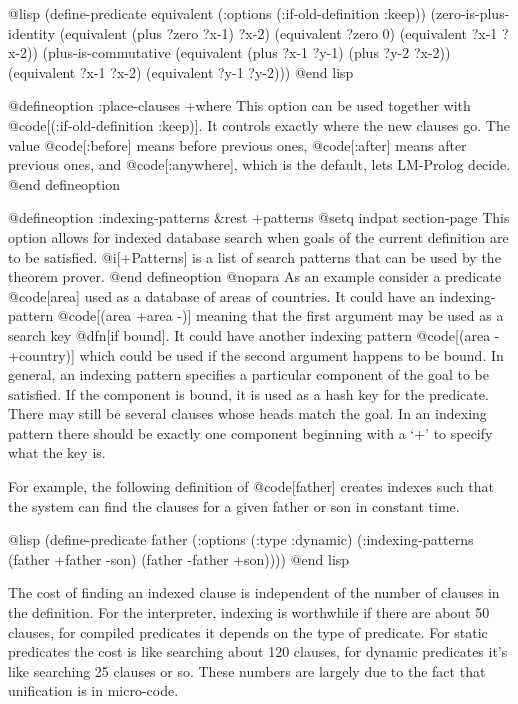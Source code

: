 {@lisp
(define-predicate equivalent
  (:options (:if-old-definition :keep))
  (zero-is-plus-identity
    (equivalent (plus ?zero ?x-1) ?x-2)
    (equivalent ?zero 0)
    (equivalent ?x-1 ?x-2))
  (plus-is-commutative
    (equivalent (plus ?x-1 ?y-1) (plus ?y-2 ?x-2))
    (equivalent ?x-1 ?x-2)
    (equivalent ?y-1 ?y-2)))
@end lisp

@defineoption :place-clauses +where
This option can be used together with @code[(:if-old-definition :keep)].
It controls exactly where the new clauses go.  The value @code[:before]
means before previous ones, @code[:after] means after previous ones, and
@code[:anywhere], which is the default, lets LM-Prolog decide.
@end defineoption

@defineoption :indexing-patterns &rest +patterns
@setq indpat section-page
This option allows for indexed database search when goals of the
current definition are to be satisfied.  @i[+Patterns] is a list
of search patterns that can be used by the theorem prover.
@end defineoption
@nopara
As an example consider a predicate @code[area] used as a database of areas
of countries.  It could have an indexing-pattern @code[(area +area -)]
meaning that the first argument may be used as a search key @dfn[if
bound].  It could have another indexing pattern @code[(area - +country)]
which could be used if the second argument happens to be bound.
In general, an indexing pattern specifies a particular component of
the goal to be satisfied.  If the component is bound,
it is used as a hash key for the predicate.  There may still be several
clauses whose heads match the goal. 
In an indexing pattern there should be exactly one component beginning with
a `+' to specify what the key is.

For example, the following definition of @code[father] creates indexes 
such that the system can find the clauses for a given father or son in constant
time.

@lisp
(define-predicate father
  (:options (:type :dynamic)
            (:indexing-patterns (father +father -son)
                                (father -father +son))))
@end lisp

The cost of finding an indexed clause is independent of the number of clauses
in the definition.
For the interpreter, indexing is worthwhile if there are about 50 
clauses, for compiled predicates it depends on the type of predicate.
For static predicates the cost is like searching about 120 
clauses, for dynamic predicates it's like searching 25 clauses or so.
These numbers are largely due to the fact that unification is in micro-code.

}
